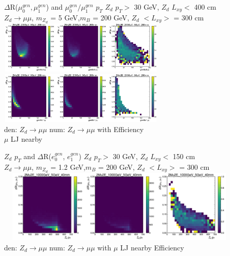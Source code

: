 \documentclass{beamer}
\begin{document}
\begin{frame}[noframenumbering,t]{$\Delta$R($\mu^{gen}_0, \mu^{gen}_1$) and $\mu_0^{gen}/\mu_1^{gen}$ $p_T$ }
\centering
 $Z_d$ $p_T>$ 30 GeV, $Z_d$ $L_{xy}<$ 400 cm\\
 \scriptsize
\textcolor{UniBlue}{$Z_d \rightarrow \mu\mu$}, \textcolor{uvaorange}{$m_{Z_d}$ = 5 GeV,$m_B$ = 200 GeV, $Z_d$ $<L_{xy}>$ = 300 cm}\\
\centering
\includegraphics[width =8cm, height =2.5cm]{zd_mumu_genMu0_pt_dR_5.png}\\
\includegraphics[width =8cm, height =2.5cm]{zd_mumu_genMu1_pt_dR_5.png}\\
{\tiny \textcolor{uvaorange}{den: $Z_d\rightarrow\mu\mu$ \hspace{36pt} num: $Z_d\rightarrow\mu\mu$ with \hspace{36pt} Efficiency\\
\vspace{-5pt}
\hspace{ 1cm } $\mu$ LJ nearby}}
\end{frame}
\begin{frame}[noframenumbering,t]{ $Z_d$ $p_T$ and $\Delta$R($e_0^{gen}$, $e_1^{gen}$) }
\centering
$Z_d$ $p_T>$ 30 GeV, $Z_d$ $L_{xy}<$ 150 cm\\
\scriptsize
\textcolor{UniBlue}{$Z_d \rightarrow \mu\mu$}, \textcolor{uvaorange}{$m_{Z_d}$ = 1.2 GeV,$m_B$ = 200 GeV, $Z_d$ $<L_{xy}>$ = 300 cm}\\
\centering
\includegraphics[width =12cm, height =3.5cm]{image (15).png}\\
{\tiny \textcolor{uvaorange}{\hspace{-1cm}den: $Z_d\rightarrow\mu\mu$ \hspace{2.5cm } num: $Z_d\rightarrow\mu\mu$ with  $\mu$ LJ nearby\hspace{2cm} Efficiency\\}}
\normalsize

\end{frame}

\end{document}
